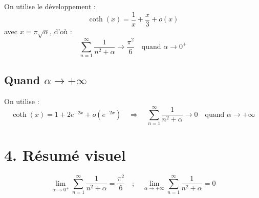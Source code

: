 \documentclass[a4paper,11pt]{article}
\begin{document}
On utilise le développement :
\[
\coth(x) = \frac{1}{x} + \frac{x}{3} + o(x)
\]
avec \( x = \pi \sqrt{\alpha} \), d'où :
\[
\sum_{n=1}^{\infty} \frac{1}{n^2 + \alpha} \to \frac{\pi^2}{6}
\quad \text{quand } \alpha \to 0^+
\]

\subsection*{Quand \( \alpha \to +\infty \)}

On utilise :
\[
\coth(x) = 1 + 2e^{-2x} + o(e^{-2x})
\quad \Rightarrow \quad
\sum_{n=1}^{\infty} \frac{1}{n^2 + \alpha} \to 0
\quad \text{quand } \alpha \to +\infty
\]

\section*{4. Résumé visuel}

\[
\boxed{
\lim_{\alpha \to 0^+} \sum_{n=1}^{\infty} \frac{1}{n^2 + \alpha} = \frac{\pi^2}{6}
\quad ; \quad
\lim_{\alpha \to +\infty} \sum_{n=1}^{\infty} \frac{1}{n^2 + \alpha} = 0
}
\]
\end{document}
